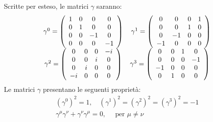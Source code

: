 \documentclass{subnucbo}
\begin{document}
Scritte per esteso, le matrici $\gamma$ saranno:
\begin{equation}
        \begin{array} {c} \gamma ^ { 0 } = \left( \begin{array} { c c c c } { 1 } & { 0 } & { 0 } & { 0 } \\ { 0 } & { 1 } & { 0 } & { 0 } \\ { 0 } & { 0 } & { - 1 } & { 0 } \\ { 0 } & { 0 } & { 0 } & { - 1 } \end{array} \right)  \quad \gamma ^ { 1 } = \left( \begin{array} { c c c c } { 0 } & { 0 } & { 0 } & { 1 } \\ { 0 } & { 0 } & { 1 } & { 0 } \\ { 0 } & { - 1 } & { 0 } & { 0 } \\ { - 1 } & { 0 } & { 0 } & { 0 } \end{array} \right) \\ \gamma ^ { 2 } = \left( \begin{array} { c c c c } { 0 } & { 0 } & { 0 } & { - i } \\ { 0 } & { 0 } & { i } & { 0 } \\ { 0 } & { i } & { 0 } & { 0 } \\ { - i } & { 0 } & { 0 } & { 0 } \end{array} \right)  \quad \gamma ^ { 3 } = \left( \begin{array} { c c c c } { 0 } & { 0 } & { 1 } & { 0 } \\ { 0 } & { 0 } & { 0 } & { - 1 } \\ { - 1 } & { 0 } & { 0 } & { 0 } \\ { 0 } & { 1 } & { 0 } & { 0 } \end{array} \right) \end{array}
        \label{eq:gamma_extended}
\end{equation}
Le matrici $\gamma$ presentano le seguenti proprietà:
\begin{equation}
        \begin{array} { c } { \left( \gamma ^ { 0 } \right) ^ { 2 } = 1 , \quad \left( \gamma ^ { 1 } \right) ^ { 2 } = \left( \gamma ^ { 2 } \right) ^ { 2 } = \left( \gamma ^ { 3 } \right) ^ { 2 } = - 1 } \\ { \gamma ^ { \mu } \gamma ^ { \nu } + \gamma ^ { \nu } \gamma ^ { \mu } = 0 , \quad \text { per } \mu \neq \nu } \end{array}
        \label{eq:gamma_properties}
\end{equation}
\end{document}
